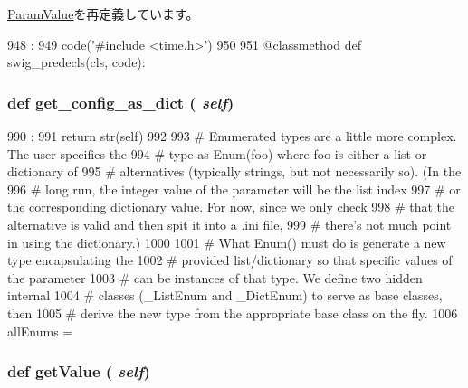 \hyperlink{classm5_1_1params_1_1ParamValue_a0b408a11a14bd1d770e28f71a6e14ab5}{ParamValue}を再定義しています。


\begin{DoxyCode}
948                                :
949         code('#include <time.h>')
950 
951     @classmethod
    def swig_predecls(cls, code):
\end{DoxyCode}
\hypertarget{classm5_1_1params_1_1Time_ab1772c0da7b9e12819e1c0373513c53c}{
\subsubsection[{get\_\-config\_\-as\_\-dict}]{\setlength{\rightskip}{0pt plus 5cm}def get\_\-config\_\-as\_\-dict ( {\em self})}}
\label{classm5_1_1params_1_1Time_ab1772c0da7b9e12819e1c0373513c53c}



\begin{DoxyCode}
990                                 :
991         return str(self)
992 
993 # Enumerated types are a little more complex.  The user specifies the
994 # type as Enum(foo) where foo is either a list or dictionary of
995 # alternatives (typically strings, but not necessarily so).  (In the
996 # long run, the integer value of the parameter will be the list index
997 # or the corresponding dictionary value.  For now, since we only check
998 # that the alternative is valid and then spit it into a .ini file,
999 # there's not much point in using the dictionary.)
1000 
1001 # What Enum() must do is generate a new type encapsulating the
1002 # provided list/dictionary so that specific values of the parameter
1003 # can be instances of that type.  We define two hidden internal
1004 # classes (_ListEnum and _DictEnum) to serve as base classes, then
1005 # derive the new type from the appropriate base class on the fly.
1006 
allEnums = {}
\end{DoxyCode}
\hypertarget{classm5_1_1params_1_1Time_acc340fbd4335fa34f9d57fb454b28ed0}{
\subsubsection[{getValue}]{\setlength{\rightskip}{0pt plus 5cm}def getValue ( {\em self})}}
\label{classm5_1_1params_1_1Time_acc340fbd4335fa34f9d57fb454b28ed0}



